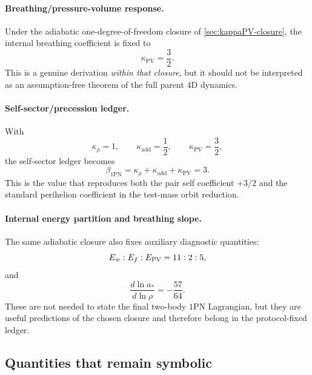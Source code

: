 \documentclass[11pt]{article}
\newcommand{\kadd}{\kappa_{\mathrm{add}}}
\newcommand{\kPV}{\kappa_{\mathrm{PV}}}
\newcommand{\krho}{\kappa_{\rho}}
\newcommand{\betaPN}{\beta_{\mathrm{1PN}}}
\begin{document}
\paragraph{Breathing/pressure-volume response.}
Under the adiabatic one-degree-of-freedom closure of \cref{sec:kappaPV-closure}, the
internal breathing coefficient is fixed to
\begin{equation}
\kPV=\frac32.
\label{eq:protocol-fixed-kPV}
\end{equation}
This is a genuine derivation \emph{within that closure}, but it should not be interpreted
as an assumption-free theorem of the full parent \(4\)D dynamics.

\paragraph{Self-sector/precession ledger.}
With
\begin{equation}
\krho=1,
\qquad
\kadd=\frac12,
\qquad
\kPV=\frac32,
\end{equation}
the self-sector ledger becomes
\begin{equation}
\betaPN=\krho+\kadd+\kPV=3.
\label{eq:protocol-fixed-beta}
\end{equation}
This is the value that reproduces both the pair self coefficient \(+3/2\) and the
standard perihelion coefficient in the test-mass orbit reduction.

\paragraph{Internal energy partition and breathing slope.}
The same adiabatic closure also fixes auxiliary diagnostic quantities:
\begin{equation}
E_w:E_f:E_{\rm PV}=11:2:5,
\label{eq:protocol-fixed-partition}
\end{equation}
and
\begin{equation}
\frac{d\ln a_*}{d\ln \rho}=-\frac{57}{64}.
\label{eq:protocol-fixed-breathing-slope}
\end{equation}
These are not needed to state the final two-body \(1\)PN Lagrangian, but they are useful
predictions of the chosen closure and therefore belong in the protocol-fixed ledger.

\subsection{Quantities that remain symbolic}
\label{sec:still-symbolic}
\end{document}
